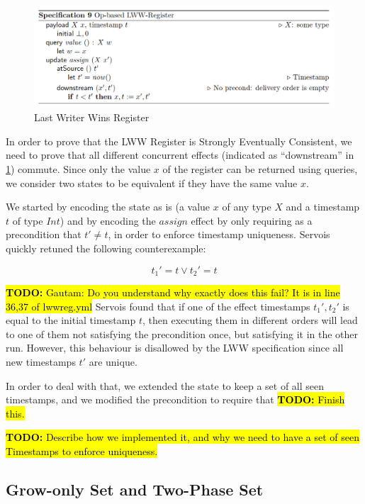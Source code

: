 \documentclass{article}
\newcommand{\TODO}[1]{\hl{\textbf{TODO:} #1}\xspace}
\begin{document}
\begin{figure}[h]
    \centering
    \includegraphics[width=\textwidth]{lww-definition}
    \caption{Last Writer Wins Register}
    \label{fig:lww-def}
\end{figure}

In order to prove that the LWW Register is Strongly Eventually
Consistent, we need to prove that all different concurrent effects
(indicated as ``downstream'' in \cref{fig:lww-def}) commute. Since
only the value $x$ of the register can be returned using queries, we
consider two states to be equivalent if they have the same value $x$.

We started by encoding the state as is (a value $x$ of any type $X$
and a timestamp $t$ of type $Int$) and by encoding the $assign$ effect
by only requiring as a precondition that $t' \neq t$, in order to
enforce timestamp uniqueness. Servois quickly retuned the following
counterexample:

\[
t_1' = t \vee t_2' = t
\]

\TODO{Gautam: Do you understand why exactly does this fail? It is in
  line 36,37 of lwwreg.yml} Servois found that if one of the effect
timestamps $t_1', t_2'$ is equal to the initial timestamp $t$, then
executing them in different orders will lead to one of them not
satisfying the precondition once, but satisfying it in the other
run. However, this behaviour is disallowed by the LWW specification
since all new timestamps $t'$ are unique.

In order to deal with that, we extended the state to keep a set of all
seen timestamps, and we modified the precondition to require that
\TODO{Finish this.}


\TODO{Describe how we implemented it, and why we need to have a set of seen Timestamps to enforce uniqueness.}

\subsection{Grow-only Set and Two-Phase Set}
\end{document}

